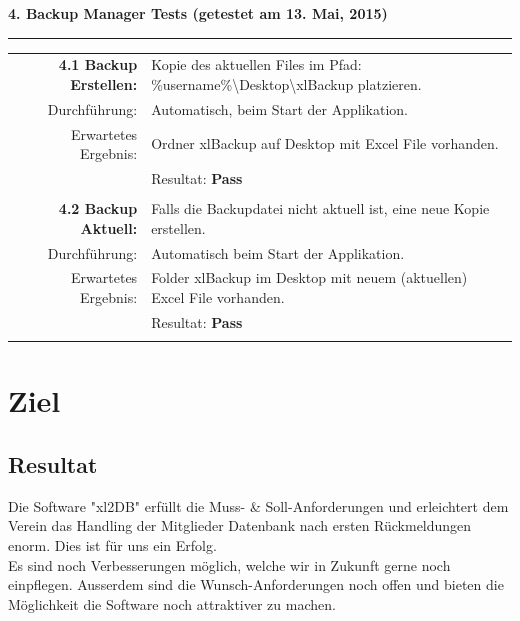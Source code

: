 \documentclass{article}
\begin{document}
\textbf{4. Backup Manager Tests (getestet am 13. Mai, 2015)\\}
\rule[2mm]{1\linewidth}{0.3mm}
\begin{tabular}{r|p{12cm}}
	\textbf{4.1 Backup Erstellen:} & Kopie des aktuellen Files im Pfad: \%username\%\textbackslash Desktop\textbackslash xlBackup platzieren. \\
		Durchführung:			& Automatisch, beim Start der Applikation.\\
		Erwartetes Ergebnis: 	& Ordner xlBackup auf Desktop mit Excel File vorhanden. \\
								& Resultat:  \textbf{Pass}\hspace{9cm} \color{green} {\ding{51}} \\
								\\	
	
	\textbf{4.2 Backup Aktuell:} & Falls die Backupdatei nicht aktuell ist, eine neue Kopie erstellen. \\
		Durchführung:			& Automatisch beim Start der Applikation.\\
		Erwartetes Ergebnis: 	& Folder xlBackup im Desktop mit neuem (aktuellen) Excel File vorhanden. \\
								& Resultat:  \textbf{Pass}\hspace{9cm} \color{green} {\ding{51}} \\
								\\	
\end{tabular}
						

\newpage


\section{Ziel}
\subsection{Resultat}

Die Software "xl2DB" erfüllt die Muss- \& Soll-Anforderungen und erleichtert dem Verein das Handling der Mitglieder Datenbank nach ersten Rückmeldungen enorm. Dies ist für uns ein Erfolg. \\
Es sind noch Verbesserungen möglich, welche wir in Zukunft gerne noch einpflegen. Ausserdem sind die Wunsch-Anforderungen noch offen und bieten die Möglichkeit die Software noch attraktiver zu machen.
\end{document}
